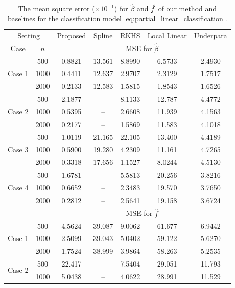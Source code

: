 \begin{table}[tb]
\centering
\centerfloat
    \caption{The mean square error ($\times 10^{-1}$) for $\hat{\beta}$ and $\hat{f}$ of our method and baselines for the classification model \eqref{eq:partial_linear_classification}.}
	\label{tab:simulation2}
		\begin{tabular}{cc| ccccc}
 \toprule[1pt]
  \multicolumn{2}{c|}{Setting} & Proposed & Spline & RKHS & Local Linear & Underpara \\
    Case & $n$ &  \multicolumn{5}{c}{MSE for $\hat{\beta}$} \\
    \midrule[1pt]
    \multirow{3}{*}{Case 1}
    & 500 &  0.8821  &  13.561  &  8.8990  & 6.5733  &  2.4930\\
    &1000 &  0.4411  & 12.637   &  2.9707  &  2.3129 & 1.7517 \\
    &2000 &  0.2133 &  12.583  &  1.5815  &  1.8543 & 1.6526 \\
    \multirow{3}{*}{Case 2}
    & 500 &  2.1877  &  --  &  8.1133  & 12.787  &  4.4772\\
    &1000 &  0.5395  &  --  &  2.6608  &  11.939 &  4.1563\\
    &2000 &  0.2177  &  --  &  1.5869  &  11.583 &  4.1018\\
    \multirow{3}{*}{Case 3}
    & 500 &  1.0119  &  21.165  &  22.105  & 13.400  & 4.4189 \\
    &1000 &  0.5900 &  19.280  &  4.2309  & 11.161  & 4.7265 \\
    &2000 &  0.3318 &  17.656  &  1.1527  & 8.0244  & 4.5130 \\
    \multirow{3}{*}{Case 4}
    & 500 &  1.6781  &  --  &  5.5813  &  20.256 & 3.8216 \\
    &1000 &  0.6652  &  --  &  2.3483  & 19.570  & 3.7650 \\
    &2000 &  0.2812  &  --  &  2.5641  & 19.158  & 3.6724\\
        \hline
   && \multicolumn{5}{c}{MSE for $\hat{f}$} \\
     \hline
\multirow{3}{*}{Case 1}
    & 500 &  4.5624 &  39.087  &  9.0062  & 61.677  &  6.9442\\
    &1000 &  2.5099 & 39.043   &  5.0402  & 59.122  & 5.6270 \\
    &2000 &  1.7524  &  38.999  &  3.9864  & 58.263  & 5.2535 \\
    \multirow{3}{*}{Case 2}
    & 500 &  22.417  &  --  &  7.5404  &  29.051 & 11.793 \\
    &1000 &  5.0438  &  --  &  4.0622  &  28.991 & 11.529 \\

\end{tabular}
\end{table}
